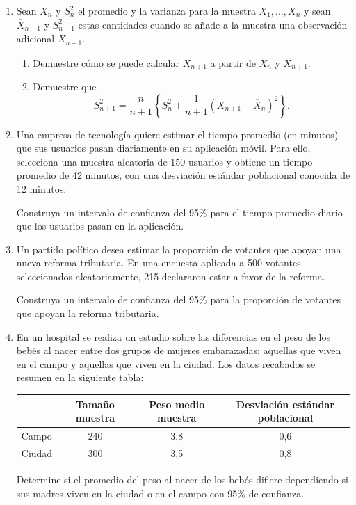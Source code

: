 \documentclass[letterpaper,11pt]{article}
\begin{document}
 
\begin{enumerate}



\item Sean $\overline{X}_n$ y $S_n^2$ el promedio y la varianza para la muestra $X_1, \ldots, X_n$ y sean $\overline{X}_{n+1}$ y $S_{n+1}^2$ estas cantidades cuando se añade a la muestra una observación adicional $X_{n+1}$.
    \begin{enumerate}
        \item[(a)] Demuestre cómo se puede calcular $\overline{X}_{n+1}$ a partir de $\overline{X}_n$ y $X_{n+1}$.
        \item[(b)] Demuestre que
        \[
        S_{n+1}^2 = \frac{n}{n+1} \left\{ S_n^2 + \frac{1}{n+1} \left( X_{n+1} - \overline{X}_n \right)^2 \right\}.
        \]
    \end{enumerate}



\item Una empresa de tecnología quiere estimar el tiempo promedio (en minutos) que sus usuarios pasan diariamente en su aplicación móvil. Para ello, selecciona una muestra aleatoria de 150 usuarios y obtiene un tiempo promedio de 42 minutos, con una desviación estándar poblacional conocida de 12 minutos.

Construya un intervalo de confianza del 95\% para el tiempo promedio diario que los usuarios pasan en la aplicación.

\item Un partido político desea estimar la proporción de votantes que apoyan una nueva reforma tributaria. En una encuesta aplicada a 500 votantes seleccionados aleatoriamente, 215 declararon estar a favor de la reforma.

Construya un intervalo de confianza del 95\% para la proporción de votantes que apoyan la reforma tributaria.

\item En un hospital se realiza un estudio sobre las diferencias en el peso de los bebés al nacer entre dos grupos de mujeres embarazadas: aquellas que viven en el campo y aquellas que viven en la ciudad. Los datos recabados se resumen en la siguiente tabla:
\begin{center}
    \begin{tabular}{| l| c | c| c|}
\hline
& Tamaño muestra& Peso medio muestra & Desviación estándar poblacional \\ \hline
Campo &240 &3,8&0,6 \\
Ciudad & 300& 3,5& 0,8\\ \hline
\end{tabular}
\end{center}
Determine si el promedio del peso al nacer de los bebés difiere dependiendo si sus madres viven en la ciudad o en el campo con 95\% de confianza.


\end{enumerate}
\end{document}
